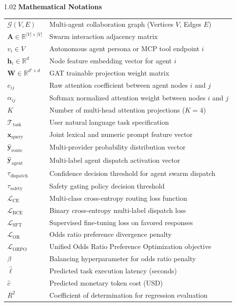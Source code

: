 \begin{spacing}{1.02}
\vspace{6pt}
\noindent \textbf{Mathematical Notations}
\nopagebreak[4]
\vspace{4pt}
\nopagebreak[4]

\noindent\begin{tabular*}{\textwidth}{@{\extracolsep{\fill}}p{2.8cm} p{11.2cm}@{}}
$\mathcal{G}(V, E)$ & Multi-agent collaboration graph (Vertices $V$, Edges $E$) \\
$\mathbf{A} \in \mathbb{R}^{|V| \times |V|}$ & Swarm interaction adjacency matrix \\
$v_i \in V$ & Autonomous agent persona or MCP tool endpoint $i$ \\
$\mathbf{h}_i \in \mathbb{R}^d$ & Node feature embedding vector for agent $i$ \\
$\mathbf{W} \in \mathbb{R}^{d' \times d}$ & GAT trainable projection weight matrix \\
$e_{ij}$ & Raw attention coefficient between agent nodes $i$ and $j$ \\
$\alpha_{ij}$ & Softmax normalized attention weight between nodes $i$ and $j$ \\
$K$ & Number of multi-head attention projections ($K = 4$) \\
$\mathcal{T}_{\text{task}}$ & User natural language task specification \\
$\mathbf{x}_{\text{query}}$ & Joint lexical and numeric prompt feature vector \\
$\hat{\mathbf{y}}_{\text{route}}$ & Multi-provider probability distribution vector \\
$\hat{\mathbf{y}}_{\text{agent}}$ & Multi-label agent dispatch activation vector \\
$\tau_{\text{dispatch}}$ & Confidence decision threshold for agent swarm dispatch \\
$\tau_{\text{safety}}$ & Safety gating policy decision threshold \\
$\mathcal{L}_{\text{CE}}$ & Multi-class cross-entropy routing loss function \\
$\mathcal{L}_{\text{BCE}}$ & Binary cross-entropy multi-label dispatch loss \\
$\mathcal{L}_{\text{SFT}}$ & Supervised fine-tuning loss on favored responses \\
$\mathcal{L}_{\text{OR}}$ & Odds ratio preference divergence penalty \\
$\mathcal{L}_{\text{ORPO}}$ & Unified Odds Ratio Preference Optimization objective \\
$\beta$ & Balancing hyperparameter for odds ratio penalty \\
$\hat{\ell}$ & Predicted task execution latency (seconds) \\
$\hat{c}$ & Predicted monetary token cost (USD) \\
$R^2$ & Coefficient of determination for regression evaluation \\
\end{tabular*}
\end{spacing}

\thispagestyle{plain}
